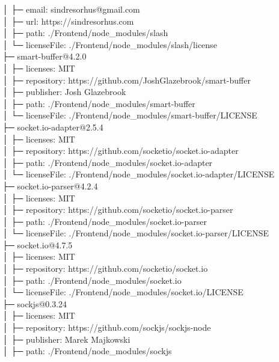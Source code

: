 \documentclass[
    paper=a4,
    twoside=false,
    parskip=half,
    listof=entryprefix,
    listof=totoc,
    index=totoc,
    bibliography=totoc,
    headsepline,
]{scrbook}
\begin{document}
    │  ├─ email: sindresorhus@gmail.com\\
    │  ├─ url: https://sindresorhus.com\\
    │  ├─ path: ./Frontend/node\_modules/slash\\
    │  └─ licenseFile: ./Frontend/node\_modules/slash/license\\
    ├─ smart-buffer@4.2.0\\
    │  ├─ licenses: MIT\\
    │  ├─ repository: https://github.com/JoshGlazebrook/smart-buffer\\
    │  ├─ publisher: Josh Glazebrook\\
    │  ├─ path: ./Frontend/node\_modules/smart-buffer\\
    │  └─ licenseFile: ./Frontend/node\_modules/smart-buffer/LICENSE\\
    ├─ socket.io-adapter@2.5.4\\
    │  ├─ licenses: MIT\\
    │  ├─ repository: https://github.com/socketio/socket.io-adapter\\
    │  ├─ path: ./Frontend/node\_modules/socket.io-adapter\\
    │  └─ licenseFile: ./Frontend/node\_modules/socket.io-adapter/LICENSE\\
    ├─ socket.io-parser@4.2.4\\
    │  ├─ licenses: MIT\\
    │  ├─ repository: https://github.com/socketio/socket.io-parser\\
    │  ├─ path: ./Frontend/node\_modules/socket.io-parser\\
    │  └─ licenseFile: ./Frontend/node\_modules/socket.io-parser/LICENSE\\
    ├─ socket.io@4.7.5\\
    │  ├─ licenses: MIT\\
    │  ├─ repository: https://github.com/socketio/socket.io\\
    │  ├─ path: ./Frontend/node\_modules/socket.io\\
    │  └─ licenseFile: ./Frontend/node\_modules/socket.io/LICENSE\\
    ├─ sockjs@0.3.24\\
    │  ├─ licenses: MIT\\
    │  ├─ repository: https://github.com/sockjs/sockjs-node\\
    │  ├─ publisher: Marek Majkowski\\
    │  ├─ path: ./Frontend/node\_modules/sockjs\\
\end{document}
